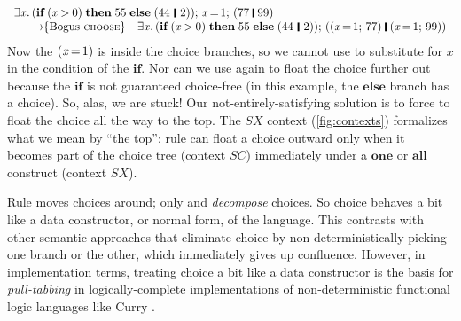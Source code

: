 \documentclass[acmsmall]{acmart}
\newcommand{\Conid}[1]{\mathit{#1}}
\newcommand{\Varid}[1]{\mathit{#1}}
\begin{document}
$$
\begin{array}{ll}
\multicolumn{2}{l}{\ensuremath{\exists\Varid{x}.\,(\textbf{if}\;(\Varid{x}\mathbin{>}\mathrm{0})\;\textbf{then}\;\mathrm{55}\;\textbf{else}\;(\mathrm{44}\hspace{0.2em}\mathop{\rule[-0.1em]{0.15em}{0.75em}}\hspace{0.2em}\mathrm{2}));\,\Varid{x}\hspace{-0.14em}=\hspace{-0.14em}\mathrm{1};\,(\mathrm{77}\;\rule[-0.1em]{0.15em}{0.75em}\;\mathrm{99})}}\\
\quad \movestoC{\text{Bogus \rulename{choose}}} & \ensuremath{\exists\Varid{x}.\,(\textbf{if}\;(\Varid{x}\mathbin{>}\mathrm{0})\;\textbf{then}\;\mathrm{55}\;\textbf{else}\;(\mathrm{44}\hspace{0.2em}\mathop{\rule[-0.1em]{0.15em}{0.75em}}\hspace{0.2em}\mathrm{2}));\,((\Varid{x}\hspace{-0.14em}=\hspace{-0.14em}\mathrm{1};\,\mathrm{77})\;\rule[-0.1em]{0.15em}{0.75em}\;(\Varid{x}\hspace{-0.14em}=\hspace{-0.14em}\mathrm{1};\,\mathrm{99}))}\\
\end{array}
$$
Now the \ensuremath{(\Varid{x}\hspace{-0.14em}=\hspace{-0.14em}\mathrm{1})} is inside the choice branches, so we cannot use  to
substitute for \ensuremath{\Varid{x}} in the condition of the \ensuremath{\textbf{if}}.
Nor can we use  again to float the choice further out
because the \ensuremath{\textbf{if}} is not guaranteed choice-free (in this example, the \ensuremath{\textbf{else}} branch has a choice).
So, alas, we are stuck!
Our not-entirely-satisfying solution is to force  to float the choice all the way
to the top.  The \ensuremath{\Conid{SX}} context (\cref{fig:contexts}) formalizes what we mean by ``the top'':
rule  can float a choice outward only when it becomes part of
the choice tree (context \ensuremath{\Conid{SC}}) immediately under a \ensuremath{\textbf{one}} or \ensuremath{\textbf{all}} construct (context \ensuremath{\Conid{SX}}).

Rule  moves choices around; only  and 
\emph{decompose} choices.
So choice behaves a bit like a data constructor, or normal form, of the language.
This contrasts with other semantic approaches that eliminate choice by non-deterministically
picking one branch or the other, which immediately gives up confluence.  However, in implementation
terms, treating choice a bit like a data constructor is the basis for \emph{pull-tabbing}
in logically-complete implementations of non-deterministic functional logic
languages like Curry \cite{antoy:pull-tabbing}.
\end{document}
